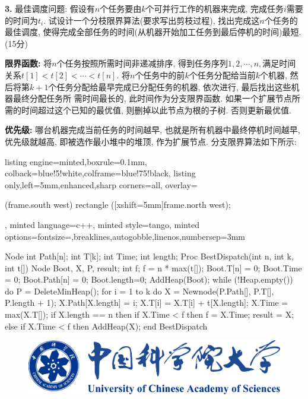 \documentclass{article}
\begin{document}
\newpage


\textbf{3.} 最佳调度问题: 假设有$n $个任务要由$k $个可并行工作的机器来完成, 完成任务$i $需要的时间为$t_i$. 试设计一个分枝限界算法(要求写出剪枝过程), 找出完成这$n $个任务的最佳调度, 使得完成全部任务的时间(从机器开始加工任务到最后停机的时间)最短. (15分)

\solution \textbf{限界函数:} 将$n$个任务按照所需时间非递减排序, 得到任务序列$1,2,\cdots,n,$满足时间关系$t[1]<t[2]<\cdots<t[n]$. 将$n$个任务中的前$k$个任务分配给当前$k$个机器, 然后将第$k+1$个任务分配给最早完成已分配任务的机器, 依次进行, 最后找出这些机器最终分配任务所
	需时间最长的, 此时间作为分支限界函数. 如果一个扩展节点所需的时间超过这个已知的最优值, 则删掉以此节点为根的子树. 否则更新最优值.

	\textbf{优先级:} 哪台机器完成当前任务的时间越早, 也就是所有机器中最终停机时间越早, 优先级就越高, 即被选作最小堆中的堆顶, 作为扩展节点. 分支限界算法如下所示:
\begin{tcblisting}{listing engine=minted,boxrule=0.1mm,
colback=blue!5!white,colframe=blue!75!black,
listing only,left=5mm,enhanced,sharp corners=all,
overlay={\begin{tcbclipinterior} (frame.south west)
rectangle ([xshift=5mm]frame.north west);\end{tcbclipinterior}},
minted language=c++,
minted style=tango,
minted options={fontsize=\small,breaklines,autogobble,linenos,numbersep=3mm}}
Node{
    int Path[n];
    int T[k];
    int Time;
    int length;
}
Proc BestDispatch(int n, int k, int t[]){
    Node Boot, X, P, result;
    int f;
    f = n * max(t[]);
    Boot.T[n] = {0};
    Boot.Time = 0;
    Boot.Path[n] = {0};
    Boot.length=0;
    AddHeap(Boot);
    while (!Heap.empty()) do {
        P = DeleteMinHeap();
        for i = 1 to k do {
            X = Newnode(P.Path[], P.T[], P.length + 1);
            X.Path[X.length] = i;
            X.T[i] = X.T[i] + t[X.length];
            X.Time = max(X.T[]);
            if X.length == n then {
                if X.Time < f then {
                    f = X.Time;
                    result = X;
                }
            }
            else {
                if X.Time < f then {
                    AddHeap(X);
                }
            }
        }
    }
}
end {BestDispatch}
\end{tcblisting}









\begin{figure}[H]  %
    \centering
    \includegraphics[width=0.35\linewidth]{images/title/ucas_logo 1.pdf}
    \label{fig:ucas-logo}
\end{figure}


\end{document}
